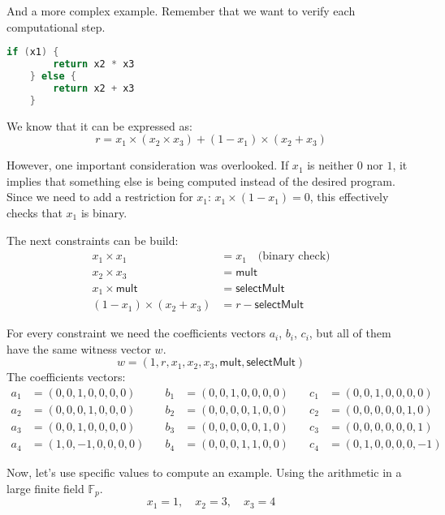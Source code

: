 \documentclass[../lecture-notes.tex]{subfiles}
\begin{document}
\begin{example}
    And a more complex example. Remember that we want to verify each computational step.

    \begin{lstlisting}[language=C,numbers=none]
    if (x1) {
        return x2 * x3
    } else {
        return x2 + x3
    }
    \end{lstlisting}

    We know that it can be expressed as:
    \[ r = x_1 \times (x_2 \times x_3) + (1 - x_1) \times (x_2 + x_3) \]

    However, one important consideration was overlooked. If $x_1$ is neither $0$ nor $1$, it implies
    that something else is being computed instead of the desired program. Since we need to add a
    restriction for $x_1$: $x_1 \times (1 - x_1) = 0$, this effectively checks that $x_1$ is binary.

    The next constraints can be build:
    \begin{align*}
        x_1 \times x_1 &= x_1 \quad \text{(binary check)} \tag{1} \\
        x_2 \times x_3 &= \mathsf{mult} \tag{2} \\
        x_1 \times \mathsf{mult} &= \mathsf{selectMult} \tag{3} \\
        (1 - x_1) \times (x_2 + x_3) &= r - \mathsf{selectMult} \tag{4}
    \end{align*}

    For every constraint we need the coefficients vectors $a_i$, $b_i$, $c_i$, but all of them have
    the same witness vector $w$.
    \[ w = (1, r, x_1, x_2, x_3, \mathsf{mult}, \mathsf{selectMult}) \]
    The coefficients vectors:
    \begin{align*}
        a_1 &= (0, 0, 1, 0, 0, 0, 0) & \quad b_1 &= (0, 0, 1, 0, 0, 0, 0) & \quad c_1 &= (0, 0, 1, 0, 0, 0, 0) \\
        a_2 &= (0, 0, 0, 1, 0, 0, 0) & \quad b_2 &= (0, 0, 0, 0, 1, 0, 0) & \quad c_2 &= (0, 0, 0, 0, 0, 1, 0) \\
        a_3 &= (0, 0, 1, 0, 0, 0, 0) & \quad b_3 &= (0, 0, 0, 0, 0, 1, 0) & \quad c_3 &= (0, 0, 0, 0, 0, 0, 1) \\
        a_4 &= (1, 0, -1, 0, 0, 0, 0) & \quad b_4 &= (0, 0, 0, 1, 1, 0, 0) & \quad c_4 &= (0, 1, 0, 0, 0, 0, -1)
    \end{align*}

    Now, let's use specific values to compute an example. Using the arithmetic in a large finite
    field $\mathbb{F}_p$.
    \[ x_1 = 1, \quad x_2 = 3, \quad x_3 = 4 \]


\end{example}
\end{document}
